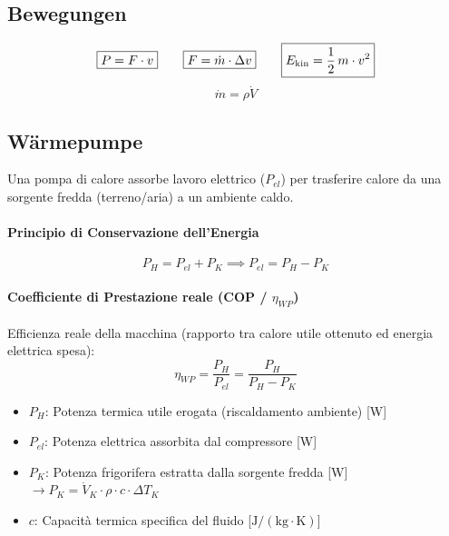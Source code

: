 \subsection{Bewegungen}

\vspace{-0.2cm}

\[\boxed{ P = F \cdot v } \qquad \boxed{F = \dot{m} \cdot \Delta v}\qquad \boxed{ E_{\rm kin} = \frac{1}{2} \, m \cdot v^2 } \]
\[\boxed{\dot{m} = \rho \dot{V}}\]

\subsection{Wärmepumpe}
Una pompa di calore assorbe lavoro elettrico ($P_{el}$) per trasferire calore da una sorgente fredda (terreno/aria) a un ambiente caldo.

\paragraph{Principio di Conservazione dell'Energia}
\begin{equation*}
P_H = P_{el} + P_K \implies P_{el} = P_H - P_K
\end{equation*}

\paragraph{Coefficiente di Prestazione reale (COP / $\eta_{WP}$)}
Efficienza reale della macchina (rapporto tra calore utile ottenuto ed energia elettrica spesa):
\begin{equation*}
\eta_{WP} = \frac{P_H}{P_{el}} = \frac{P_H}{P_H - P_K}
\end{equation*}

\begin{itemize}
    \item $P_H$: Potenza termica utile erogata (riscaldamento ambiente) [W]
    \item $P_{el}$: Potenza elettrica assorbita dal compressore [W]
    \item $P_K$: Potenza frigorifera estratta dalla sorgente fredda [W] $\rightarrow P_K = \dot{V}_K \cdot \rho \cdot c \cdot \Delta T_K$
    \item $c$: Capacità termica specifica del fluido [$\text{J}/(\text{kg}\cdot\text{K})$]
\end{itemize}


